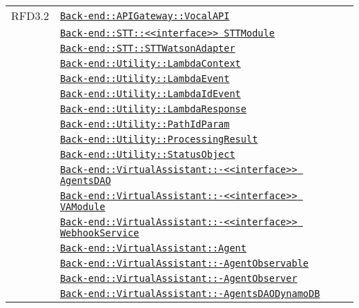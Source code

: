 \begin{longtable}{|>{\centering}m{3cm}|m{10cm}<{\centering}|}
RFD3.2 & \hyperref[Back-end::APIGateway::VocalAPI]{\texttt{Back-end::APIGateway::VocalAPI}}\\
& \hyperref[Back-end::STT::<<interface>> STTModule]{\texttt{Back-end::STT::<<interface>> STTModule}}\\
& \hyperref[Back-end::STT::STTWatsonAdapter]{\texttt{Back-end::STT::STTWatsonAdapter}}\\
& \hyperref[Back-end::Utility::LambdaContext]{\texttt{Back-end::Utility::LambdaContext}}\\
& \hyperref[Back-end::Utility::LambdaEvent]{\texttt{Back-end::Utility::LambdaEvent}}\\
& \hyperref[Back-end::Utility::LambdaIdEvent]{\texttt{Back-end::Utility::LambdaIdEvent}}\\
& \hyperref[Back-end::Utility::LambdaResponse]{\texttt{Back-end::Utility::LambdaResponse}}\\
& \hyperref[Back-end::Utility::PathIdParam]{\texttt{Back-end::Utility::PathIdParam}}\\
& \hyperref[Back-end::Utility::ProcessingResult]{\texttt{Back-end::Utility::ProcessingResult}}\\
& \hyperref[Back-end::Utility::StatusObject]{\texttt{Back-end::Utility::StatusObject}}\\
& \hyperref[Back-end::VirtualAssistant::<<interface>> AgentsDAO]{\texttt{Back-end::VirtualAssistant::-\linebreak <<interface>> AgentsDAO}}\\
& \hyperref[Back-end::VirtualAssistant::<<interface>> VAModule]{\texttt{Back-end::VirtualAssistant::-\linebreak <<interface>> VAModule}}\\
& \hyperref[Back-end::VirtualAssistant::<<interface>> WebhookService]{\texttt{Back-end::VirtualAssistant::-\linebreak <<interface>> WebhookService}}\\
& \hyperref[Back-end::VirtualAssistant::Agent]{\texttt{Back-end::VirtualAssistant::Agent}}\\
& \hyperref[Back-end::VirtualAssistant::AgentObservable]{\texttt{Back-end::VirtualAssistant::-\linebreak AgentObservable}}\\
& \hyperref[Back-end::VirtualAssistant::AgentObserver]{\texttt{Back-end::VirtualAssistant::-\linebreak AgentObserver}}\\
& \hyperref[Back-end::VirtualAssistant::AgentsDAODynamoDB]{\texttt{Back-end::VirtualAssistant::-\linebreak AgentsDAODynamoDB}}\\

\end{longtable}
